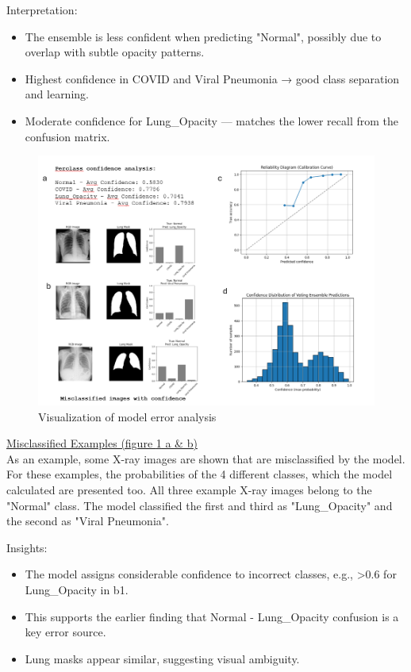 \documentclass{article}
\begin{document}
Interpretation:
\begin{itemize}
    \item The ensemble is less confident when predicting "Normal", possibly due to overlap with subtle opacity patterns. 
    \item Highest confidence in COVID and Viral Pneumonia → good class separation and learning.
    \item Moderate confidence for Lung\_Opacity — matches the lower recall from the confusion matrix.
\end{itemize}

\begin{figure}%
    \centering
    \includegraphics[width=1.0\linewidth]{error_analysis.png}
    \caption{Visualization of model error analysis}
    \label{fig:error_analysis}
\end{figure}

\vspace{0.4cm}

\underline{Misclassified Examples (figure \ref{fig:error_analysis} a \& b)}\\
As an example, some X-ray images are shown that are misclassified by the model. For these examples, the probabilities of the 4 different classes, which the model calculated are presented too. 
All three example X-ray images belong to the "Normal" class. The model classified the first and third as "Lung\_Opacity" and the second as "Viral Pneumonia". 

Insights:
\begin{itemize}
    \item The model assigns considerable confidence to incorrect classes, e.g., >0.6 for Lung\_Opacity in b1.
    \item This supports the earlier finding that Normal - Lung\_Opacity confusion is a key error source.
    \item Lung masks appear similar, suggesting visual ambiguity.
\end{itemize}
\end{document}
